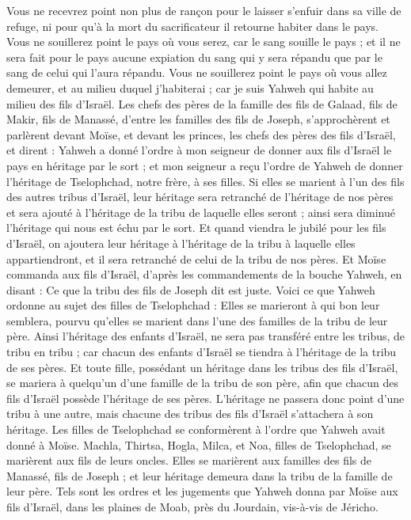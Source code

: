 \begin{multicols}{2}
Vous ne recevrez point non plus de rançon pour le laisser s’enfuir dans sa ville de refuge, ni pour qu'à la mort du sacrificateur il retourne habiter dans le pays.
Vous ne souillerez point le pays où vous serez, car le sang souille le pays ; et il ne sera fait pour le pays aucune expiation du sang qui y sera répandu que par le sang de celui qui l'aura répandu.
Vous ne souillerez point le pays où vous allez demeurer, et au milieu duquel j'habiterai ; car je suis Yahweh qui habite au milieu des fils d'Israël.
\VerseOne{}Les chefs des pères de la famille des fils de Galaad, fils de Makir, fils de Manassé, d'entre les familles des fils de Joseph, s'approchèrent et parlèrent devant Moïse, et devant les princes, les chefs des pères des fils d'Israël,
et dirent : Yahweh a donné l’ordre à mon seigneur de donner aux fils d'Israël le pays en héritage par le sort ; et mon seigneur a reçu l'ordre de Yahweh de donner l'héritage de Tselophchad, notre frère, à ses filles.
Si elles se marient à l'un des fils des autres tribus d'Israël, leur héritage sera retranché de l'héritage de nos pères et sera ajouté à l’héritage de la tribu de laquelle elles seront ; ainsi sera diminué l'héritage qui nous est échu par le sort.
Et quand viendra le jubilé pour les fils d'Israël, on ajoutera leur héritage à l'héritage de la tribu à laquelle elles appartiendront, et il sera retranché de celui de la tribu de nos pères.
Et Moïse commanda aux fils d'Israël, d’après les commandements de la bouche Yahweh, en disant : Ce que la tribu des fils de Joseph dit est juste.
Voici ce que Yahweh ordonne au sujet des filles de Tselophchad : Elles se marieront à qui bon leur semblera, pourvu qu’elles se marient dans l'une des familles de la tribu de leur père.
Ainsi l’héritage des enfants d’Israël, ne sera pas transféré entre les tribus, de tribu en tribu ; car chacun des enfants d’Israël se tiendra à l’héritage de la tribu de ses pères.
Et toute fille, possédant un héritage dans les tribus des fils d'Israël, se mariera à quelqu'un d’une famille de la tribu de son père, afin que chacun des fils d'Israël possède l'héritage de ses pères.
L'héritage ne passera donc point d'une tribu à une autre, mais chacune des tribus des fils d'Israël s’attachera à son héritage.
Les filles de Tselophchad se conformèrent à l’ordre que Yahweh avait donné à Moïse.
Machla, Thirtsa, Hogla, Milca, et Noa, filles de Tselophchad, se marièrent aux fils de leurs oncles.
Elles se marièrent aux familles des fils de Manassé, fils de Joseph ; et leur héritage demeura dans la tribu de la famille de leur père.
Tels sont les ordres et les jugements que Yahweh donna par Moïse aux fils d'Israël, dans les plaines de Moab, près du Jourdain, vis-à-vis de Jéricho.
\PPE{}
\end{multicols}
